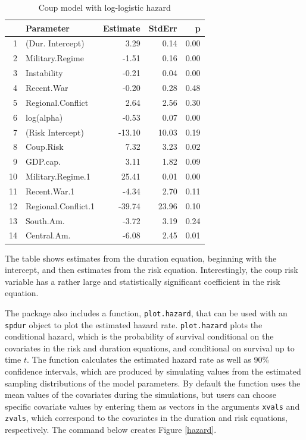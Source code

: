\documentclass[article]{jss}
\begin{document}
\begin{table}[ht]
\centering
\caption{Coup model with log-logistic hazard} \label{loglog_table}
\begin{tabular}{rlrrr}
  \hline
 & Parameter & Estimate & StdErr & p \\ 
  \hline
1 & (Dur. Intercept) & 3.29 & 0.14 & 0.00 \\ 
  2 & Military.Regime & -1.51 & 0.16 & 0.00 \\ 
  3 & Instability & -0.21 & 0.04 & 0.00 \\ 
  4 & Recent.War & -0.20 & 0.28 & 0.48 \\ 
  5 & Regional.Conflict & 2.64 & 2.56 & 0.30 \\ 
  6 & log(alpha) & -0.53 & 0.07 & 0.00 \\ 
  7 & (Risk Intercept) & -13.10 & 10.03 & 0.19 \\ 
  8 & Coup.Risk & 7.32 & 3.23 & 0.02 \\ 
  9 & GDP.cap. & 3.11 & 1.82 & 0.09 \\ 
  10 & Military.Regime.1 & 25.41 & 0.01 & 0.00 \\ 
  11 & Recent.War.1 & -4.34 & 2.70 & 0.11 \\ 
  12 & Regional.Conflict.1 & -39.74 & 23.96 & 0.10 \\ 
  13 & South.Am. & -3.72 & 3.19 & 0.24 \\ 
  14 & Central.Am. & -6.08 & 2.45 & 0.01 \\ 
   \hline
\end{tabular}
\end{table}

\normalsize
The table shows estimates from the duration equation, beginning with the
intercept, and then estimates from the risk equation. Interestingly, the
coup risk variable has a rather large and statistically significant
coefficient in the risk equation.

The package also includes a function, \texttt{plot.hazard}, that can be
used with an \texttt{spdur} object to plot the estimated hazard rate.
\texttt{plot.hazard} plots the conditional hazard, which is the
probability of survival conditional on the covariates in the risk and
duration equations, and conditional on survival up to time \(t\). The
function calculates the estimated hazard rate as well as 90\% confidence
intervals, which are produced by simulating values from the estimated
sampling distributions of the model parameters. By default the function
uses the mean values of the covariates during the simulations, but users
can choose specific covariate values by entering them as vectors in the
arguments \texttt{xvals} and \texttt{zvals}, which correspond to the
covariates in the duration and risk equations, respectively. The command
below creates Figure \ref{hazard}.
\end{document}
